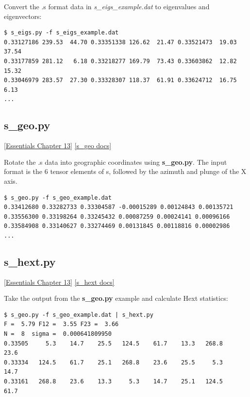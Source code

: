 \documentclass[11pt]{book}
\begin{document}
{Convert the .s format data in {\it s\_eigs\_example.dat} to eigenvalues and eigenvectors:

\begin{verbatim}
$ s_eigs.py -f s_eigs_example.dat
0.33127186 239.53  44.70 0.33351338 126.62  21.47 0.33521473  19.03  37.54
0.33177859 281.12   6.18 0.33218277 169.79  73.43 0.33603862  12.82  15.32
0.33046979 283.57  27.30 0.33328307 118.37  61.91 0.33624712  16.75   6.13
...
\end{verbatim}


\subsection{s\_geo.py}
\href{http://earthref.org/MAGIC/books/Tauxe/Essentials/WebBook3ch13.html#ch13}{[Essentials Chapter 13]}
\href{https://github.com/PmagPy/PmagPy/blob/master/programs/s_geo.py}{[s\_geo docs]}

Rotate the .s data into geographic coordinates using {\bf s\_geo.py}.  The input format is the 6 tensor elements of s, followed by the azimuth and plunge of the X axis.

\begin{verbatim}
$ s_geo.py -f s_geo_example.dat
0.33412680 0.33282733 0.33304587 -0.00015289 0.00124843 0.00135721
0.33556300 0.33198264 0.33245432 0.00087259 0.00024141 0.00096166
0.33584908 0.33140627 0.33274469 0.00131845 0.00118816 0.00002986
...
\end{verbatim}


\subsection{s\_hext.py}
\href{http://earthref.org/MAGIC/books/Tauxe/Essentials/WebBook3ch13.html#ch13}{[Essentials Chapter 13]}
\href{https://github.com/PmagPy/PmagPy/blob/master/programs/s_hext.py}{[s\_hext docs]}


Take the output from the {\bf s\_geo.py} example and calculate Hext statistics:

\begin{verbatim}
$ s_geo.py -f s_geo_example.dat | s_hext.py
F =  5.79 F12 =  3.55 F23 =  3.66
N =  8  sigma =  0.000641809950
0.33505     5.3    14.7    25.5   124.5    61.7    13.3   268.8    23.6
0.33334   124.5    61.7    25.1   268.8    23.6    25.5     5.3    14.7
0.33161   268.8    23.6    13.3     5.3    14.7    25.1   124.5    61.7


\end{verbatim}}
\end{document}
